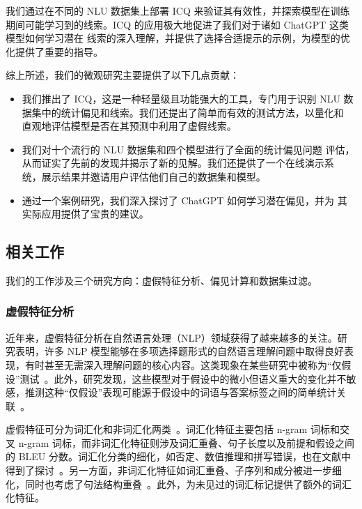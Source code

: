 我们通过在不同的 NLU 数据集上部署 ICQ 来验证其有效性，并探索模型在训练
期间可能学习到的线索。ICQ 的应用极大地促进了我们对于诸如 ChatGPT%
这类模型如何学习潜在
线索的深入理解，并提供了选择合适提示的示例，为模型的优化提供了重要的指导。

综上所述，我们的微观研究主要提供了以下几点贡献：
\begin{itemize}
\item 我们推出了 ICQ，这是一种轻量级且功能强大的工具，专门用于识别 
NLU 数据集中的统计偏见和线索。我们还提出了简单而有效的测试方法，以量化和
直观地评估模型是否在其预测中利用了虚假线索。
\item 我们对十个流行的 NLU 数据集和四个模型进行了全面的统计偏见问题
评估，从而证实了先前的发现并揭示了新的见解。我们还提供了一个在线演示系
统，展示结果并邀请用户评估他们自己的数据集和模型。
\item 通过一个案例研究，我们深入探讨了 ChatGPT 如何学习潜在偏见，并为
其实际应用提供了宝贵的建议。
\end{itemize}

\subsection{相关工作}
\label{sec3:related}

我们的工作涉及三个研究方向：虚假特征分析、偏见计算和数据集过滤。

\subsubsection*{虚假特征分析}
近年来，虚假特征分析在自然语言处理（NLP）领域获得了越来越多的关注。研究表明，许多 NLP 模型能够在多项选择题形式的自然语言理解问题中取得良好表现，有时甚至无需深入理解问题的核心内容。这类现象在某些研究中被称为``仅假设''测试~\cite{sharma2018tackling,srinivasan2018simple,zellers2018swag}。此外，研究发现，这些模型对于假设中的微小但语义重大的变化并不敏感，推测这种``仅假设''表现可能源于假设中的词语与答案标签之间的简单统计关联~\cite{sanchez2018behavior}。

虚假特征可分为词汇化和非词汇化两类~\cite{bowman2015large}。词汇化特征主要包括 n-gram 词标和交叉 n-gram 词标，而非词汇化特征则涉及词汇重叠、句子长度以及前提和假设之间的 BLEU 分数。词汇化分类的细化，如否定、数值推理和拼写错误，也在文献中得到了探讨~\cite{naik2018stress}。另一方面，非词汇化特征如词汇重叠、子序列和成分被进一步细化，同时也考虑了句法结构重叠~\cite{mccoy2019right}。此外，\cite{sanchez2018behavior}为未见过的词汇标记提供了额外的词汇化特征。

